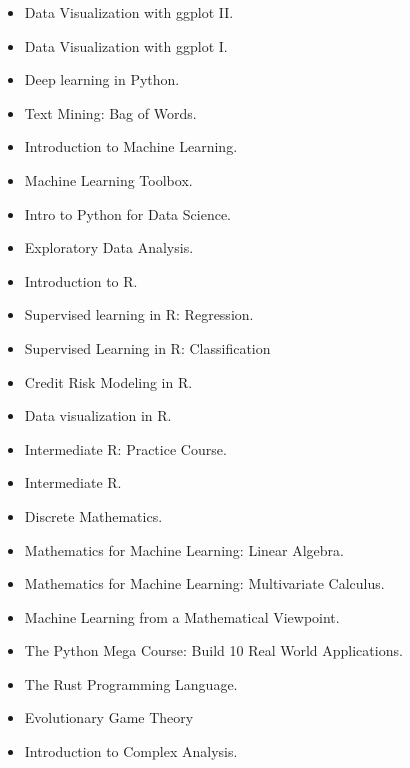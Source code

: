 \documentclass[a4paper,11pt]{article}
\newcommand{\years}[1]{\marginnote{\scriptsize #1}}
\begin{document}
\years{Certificates}
\vspace{-2pt}
\begin{itemize}[noitemsep, leftmargin=*]
  \item Data Visualization with ggplot II.
  \item Data Visualization with ggplot I.
  \item Deep learning in Python.
  \item Text Mining: Bag of Words. 
  \item Introduction to Machine Learning.
  \item Machine Learning Toolbox.
  \item Intro to Python for Data Science. 
  \item Exploratory Data Analysis.
  \item Introduction to R.
  \item Supervised learning in R: Regression.
  \item Supervised Learning in R: Classification 
  \item Credit Risk Modeling in R.
  \item Data visualization in R.
  \item Intermediate R: Practice Course.
  \item Intermediate R.
  \item Discrete Mathematics.
  \item Mathematics for Machine Learning: Linear Algebra. 
  \item Mathematics for Machine Learning: Multivariate Calculus.
  \item Machine Learning from a Mathematical Viewpoint.
  \item The Python Mega Course: Build 10 Real World Applications.
  \item The Rust Programming Language.
  \item Evolutionary Game Theory
  \item Introduction to Complex Analysis.
\end{itemize}
\vspace{2pt}
\end{document}
